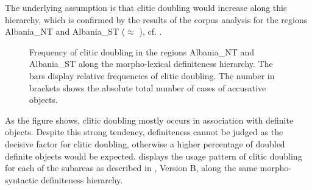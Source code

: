 \documentclass[output=paper]{langsci/langscibook}
\begin{document}
The underlying assumption is that clitic doubling would increase along this hierarchy, which is confirmed by the results of the corpus analysis for the regions Albania\_NT and Albania\_ST ($\approx$ ), cf. .

\begin{figure}
\footnotesize
\caption{Frequency of clitic doubling in the regions Albania\_NT and Albania\_ST along the morpho-lexical definiteness hierarchy. The bars display relative frequencies of clitic doubling. The number in brackets shows the absolute total number of cases of accusative objects.\label{fig9}}
\end{figure}

As the figure shows, clitic doubling mostly occurs in association with definite objects. Despite this strong tendency, definiteness cannot be judged as the decisive factor for clitic doubling, otherwise a higher percentage of doubled definite objects would be expected.  displays the usage pattern of clitic doubling for each of the subareas as described in , Version B, along the same morpho-syntactic definiteness hierarchy. 
\end{document}
